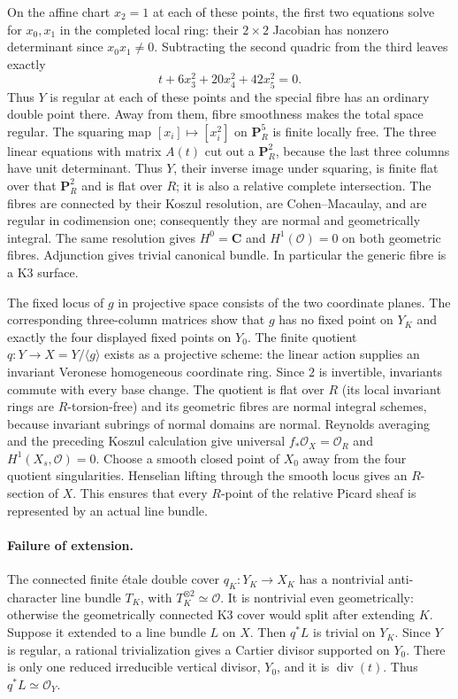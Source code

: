 On the affine chart $x_2=1$ at each of these points, the first two equations
solve for $x_0,x_1$ in the completed local ring: their $2\times2$ Jacobian
has nonzero determinant since $x_0x_1\ne0$. Subtracting the second quadric
from the third leaves exactly
\[
 t+6x_3^2+20x_4^2+42x_5^2=0.                         \tag{E4.N.1}
\]
Thus $Y$ is regular at each of these points and the special fibre has an
ordinary double point there. Away from them, fibre smoothness makes the
total space regular. The squaring map $[x_i]\mapsto[x_i^2]$ on $\mathbf P^5_R$ is finite
locally free. The three linear equations with matrix $A(t)$ cut out a
$\mathbf P^2_R$, because the last three columns have unit determinant.
Thus $Y$, their inverse image under squaring, is finite flat over that
$\mathbf P^2_R$ and is flat over $R$; it is also a relative complete
intersection.
The fibres are connected by their Koszul resolution, are Cohen--Macaulay,
and are regular in codimension one; consequently they are normal and
geometrically integral. The same resolution gives $H^0=\mathbf C$ and
$H^1(\mathcal O)=0$ on both geometric fibres. Adjunction gives trivial
canonical bundle. In particular the generic fibre is a K3 surface.

The fixed locus of $g$ in projective space consists of the two coordinate
planes. The corresponding three-column matrices show that $g$ has no
fixed point on $Y_K$ and exactly the four displayed fixed points on $Y_0$.
The finite quotient $q:Y\to X=Y/\langle g\rangle$ exists as a projective
scheme: the linear action supplies an invariant Veronese homogeneous
coordinate ring. Since $2$ is invertible, invariants commute with every
base change. The quotient is flat over $R$ (its local invariant rings are
$R$-torsion-free) and its geometric fibres are normal integral schemes,
because invariant subrings of normal domains are normal. Reynolds
averaging and the preceding Koszul calculation give universal
$f_*\mathcal O_X=\mathcal O_R$ and $H^1(X_s,\mathcal O)=0$.
Choose a smooth closed point of $X_0$ away from the four quotient singularities.
Henselian lifting through the smooth locus gives an $R$-section of $X$.
This ensures that every $R$-point of the relative Picard sheaf is represented
by an actual line bundle.

\paragraph{Failure of extension.}
The connected finite \'etale double cover $q_K:Y_K\to X_K$ has a nontrivial
anti-character line bundle $T_K$, with $T_K^{\otimes2}\simeq\mathcal O$.
It is nontrivial even geometrically: otherwise the geometrically connected
K3 cover would split after extending $K$. Suppose it extended to a line
bundle $L$ on $X$. Then $q^*L$ is trivial on $Y_K$. Since $Y$ is regular,
a rational trivialization gives a Cartier divisor supported on $Y_0$.
There is only one reduced irreducible vertical divisor, $Y_0$, and it is
$\operatorname{div}(t)$. Thus $q^*L\simeq\mathcal O_Y$.

